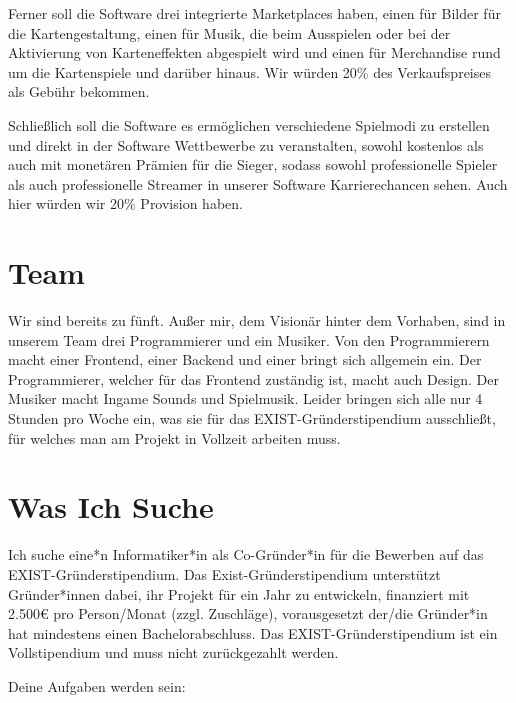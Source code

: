 \documentclass[fontsize=12]{scrartcl}
\begin{document}
	\noindent Ferner soll die Software drei integrierte Marketplaces haben, einen für Bilder für die Kartengestaltung, einen für Musik, die beim Ausspielen oder bei der Aktivierung von Karteneffekten abgespielt wird und einen für Merchandise rund um die Kartenspiele und darüber hinaus. Wir würden 20\% des Verkaufspreises als Gebühr bekommen.\hfill\newline
	
	\noindent Schließlich soll die Software es ermöglichen verschiedene Spielmodi zu erstellen und direkt in der Software Wettbewerbe zu veranstalten, sowohl kostenlos als auch mit monetären Prämien für die Sieger, sodass sowohl professionelle Spieler als auch professionelle Streamer in unserer Software Karrierechancen sehen. Auch hier würden wir 20\% Provision haben.
	
	\section{Team}
	
	Wir sind bereits zu fünft. Außer mir, dem Visionär hinter dem Vorhaben, sind in unserem Team drei Programmierer und ein Musiker. Von den Programmierern macht einer Frontend, einer Backend und einer bringt sich allgemein ein. Der Programmierer, welcher für das Frontend zuständig ist, macht auch Design. Der Musiker macht Ingame Sounds und Spielmusik. Leider bringen sich alle nur 4 Stunden pro Woche ein, was sie für das EXIST-Gründerstipendium ausschließt, für welches man am Projekt in Vollzeit arbeiten muss.
	
	\section{Was Ich Suche}
	
	Ich suche eine*n Informatiker*in als Co-Gründer*in für die Bewerben auf das EXIST-Gründerstipendium. Das Exist-Gründerstipendium unterstützt Gründer*innen dabei, ihr Projekt für ein Jahr zu entwickeln, finanziert mit 2.500€ pro Person/Monat (zzgl. Zuschläge), vorausgesetzt der/die Gründer*in hat mindestens einen Bachelorabschluss. Das EXIST-Gründerstipendium ist ein Vollstipendium und muss nicht zurückgezahlt werden.\hfill\newline
	
	\noindent Deine Aufgaben werden sein:
	
\end{document}
